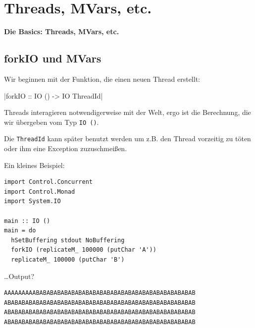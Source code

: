 \documentclass{beamer}
\begin{document}

\section{Threads, MVars, etc.}

\begin{frame}

\begin{center}
\Large
\textbf{Die Basics: Threads, MVars, etc.}
\end{center}

\end{frame}


\subsection{forkIO und MVars}

\begin{frame}[fragile]

Wir beginnen mit der Funktion, die einen neuen Thread erstellt:

|forkIO :: IO () -> IO ThreadId|
\pause

Threads interagieren notwendigerweise mit der Welt, ergo ist die Berechnung, die wir 
übergeben vom Typ \texttt{IO ()}.\smallskip\smallskip
\pause

Die \texttt{ThreadId} kann später benutzt werden um z.B. den Thread vorzeitig zu töten oder ihm
eine Exception zuzuschmeißen.
\end{frame}


\begin{frame}[fragile]

Ein kleines Beispiel:

\begin{verbatim}
import Control.Concurrent
import Control.Monad
import System.IO

main :: IO ()
main = do
  hSetBuffering stdout NoBuffering
  forkIO (replicateM_ 100000 (putChar 'A')) 
  replicateM_ 100000 (putChar 'B')
\end{verbatim}
\pause
\dots Output?
\pause
\begin{verbatim}
AAAAAAAAABABABABABABABABABABABABABABABABABABABABABABAB
ABABABABABABABABABABABABABABABABABABABABABABABABABABAB
ABABABABABABABABABABABABABABABABABABABABABABABABABABAB
ABABABABABABABABABABABABABABABABABABABABABABABABABABAB
\end{verbatim}
\end{frame}
\end{document}
